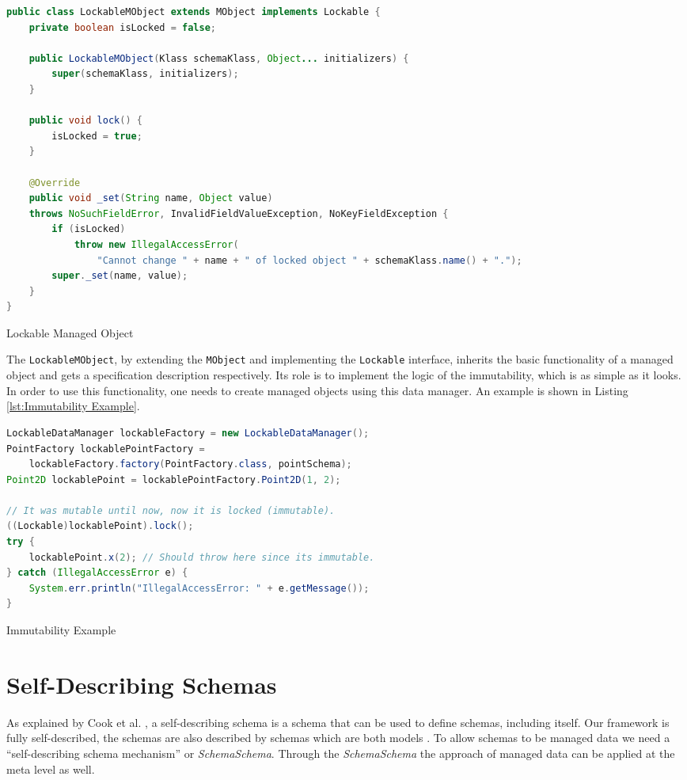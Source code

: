 \begin{sourcecode} [H]
	\begin{lstlisting}[language=Java, escapechar=|]
public class LockableMObject extends MObject implements Lockable {
	private boolean isLocked = false;

	public LockableMObject(Klass schemaKlass, Object... initializers) {
		super(schemaKlass, initializers);
	}

	public void lock() {
		isLocked = true;
	}

	@Override
	public void _set(String name, Object value) 
	throws NoSuchFieldError, InvalidFieldValueException, NoKeyFieldException {
		if (isLocked)
	    	throw new IllegalAccessError(
	    		"Cannot change " + name + " of locked object " + schemaKlass.name() + ".");
		super._set(name, value);
	}
}
	\end{lstlisting}
	\caption{Lockable Managed Object}
	\label{lst:Lockable Managed Object}
\end{sourcecode}

The \texttt{LockableMObject}, by extending the \texttt{MObject} and implementing the \texttt{Lockable} interface, inherits the basic functionality of a managed object and gets a specification description respectively.
Its role is to implement the logic of the immutability, which is as simple as it looks.
In order to use this functionality, one needs to create managed objects using this data manager.
An example is shown in Listing \ref{lst:Immutability Example}.

\begin{sourcecode} [H]
	\begin{lstlisting}[language=Java, escapechar=|]
LockableDataManager lockableFactory = new LockableDataManager();
PointFactory lockablePointFactory = 
	lockableFactory.factory(PointFactory.class, pointSchema);
Point2D lockablePoint = lockablePointFactory.Point2D(1, 2);

// It was mutable until now, now it is locked (immutable).
((Lockable)lockablePoint).lock();
try {
	lockablePoint.x(2); // Should throw here since its immutable.
} catch (IllegalAccessError e) {
	System.err.println("IllegalAccessError: " + e.getMessage());
}
	\end{lstlisting}
	\caption{Immutability Example}
	\label{lst:Immutability Example}
\end{sourcecode}

\section{Self-Describing Schemas}\label{Self-Describing Schemas}
As explained by Cook et al. \cite{loh2012managed}, a self-describing schema is a schema that can be used to define schemas, including itself.
Our framework is fully self-described, the schemas are also described by schemas which are both models \cite{kurtev2006model}. 
To allow schemas to be managed data we need a ``self-describing schema mechanism'' or \textit{SchemaSchema}.
Through the \textit{SchemaSchema} the approach of managed data can be applied at the meta level as well.

